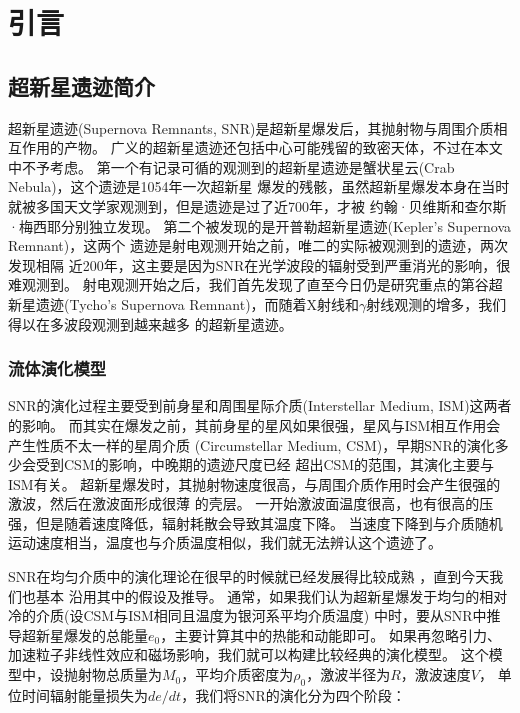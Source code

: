 \chapter{引言}
\label{Intro}

\section{超新星遗迹简介}
\label{SNRintro}
超新星遗迹(Supernova Remnants, SNR)是超新星爆发后，其抛射物与周围介质相互作用的产物。
广义的超新星遗迹还包括中心可能残留的致密天体，不过在本文中不予考虑。
第一个有记录可循的观测到的超新星遗迹是蟹状星云(Crab Nebula)，这个遗迹是1054年一次超新星
爆发的残骸，虽然超新星爆发本身在当时就被多国天文学家观测到，但是遗迹是过了近700年，才被
约翰·贝维斯和查尔斯·梅西耶分别独立发现\citep{barrow2011cosmic}。
第二个被发现的是开普勒超新星遗迹(Kepler's Supernova Remnant)\citep{Baade1943}，这两个
遗迹是射电观测开始之前，唯二的实际被观测到的遗迹\citep{Minkowski1964}，两次发现相隔
近200年，这主要是因为SNR在光学波段的辐射受到严重消光的影响，很难观测到。
射电观测开始之后，我们首先发现了直至今日仍是研究重点的第谷超新星遗迹(Tycho's
Supernova Remnant)，而随着X射线和$\gamma$射线观测的增多，我们得以在多波段观测到越来越多
的超新星遗迹。

\subsection{流体演化模型}

SNR的演化过程主要受到前身星和周围星际介质(Interstellar Medium, ISM)这两者的影响。
而其实在爆发之前，其前身星的星风如果很强，星风与ISM相互作用会产生性质不太一样的星周介质
(Circumstellar Medium, CSM)，早期SNR的演化多少会受到CSM的影响，中晚期的遗迹尺度已经
超出CSM的范围，其演化主要与ISM有关。
超新星爆发时，其抛射物速度很高，与周围介质作用时会产生很强的激波，然后在激波面形成很薄
的壳层。
一开始激波面温度很高，也有很高的压强，但是随着速度降低，辐射耗散会导致其温度下降。
当速度下降到与介质随机运动速度相当，温度也与介质温度相似，我们就无法辨认这个遗迹了。

SNR在均匀介质中的演化理论在很早的时候就已经发展得比较成熟
\citep{1959sdmm.book.....S, 1970IAUS...39..229W, Woltjer1972}，直到今天我们也基本
沿用其中的假设及推导。
通常，如果我们认为超新星爆发于均匀的相对冷的介质(设CSM与ISM相同且温度为银河系平均介质温度)
中时，要从SNR中推导超新星爆发的总能量$e_0$，主要计算其中的热能和动能即可。
如果再忽略引力、加速粒子非线性效应和磁场影响，我们就可以构建比较经典的演化模型。
这个模型中，设抛射物总质量为$M_0$，平均介质密度为$\rho_0$，激波半径为$R$，激波速度$V$，
单位时间辐射能量损失为$de/dt$，我们将SNR的演化分为四个阶段：

